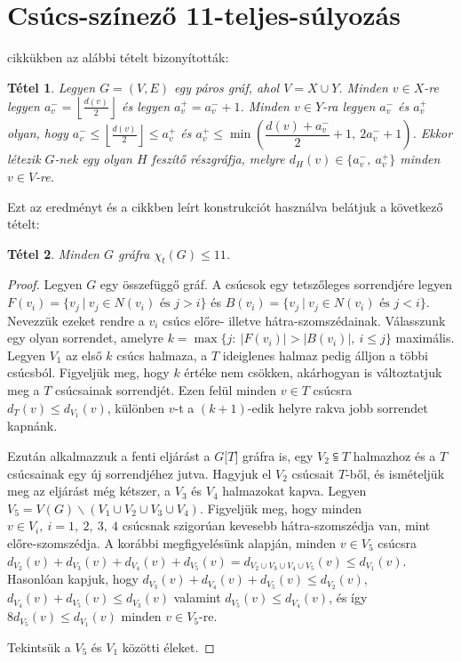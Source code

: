 \documentclass[12pt, a4paper]{report}
\newtheorem{tét}{Tétel}[section]
\theoremstyle{remark}
\theoremstyle{definition}
\begin{document}
\section{Csúcs-színező 11-teljes-súlyozás}
\citeauthor{AddarioBerry2008} \cite{AddarioBerry2008} cikkükben az alábbi tételt bizonyították:

\begin{tét}
Legyen $G=(V, E)$ egy páros gráf, ahol $V = X \cup Y$. Minden $v \in X$-re legyen $a_v^- = \left\lfloor \frac{d(v)}{2} \right\rfloor$ és legyen $a_v^+ = a_v^- + 1$. Minden $v \in Y$-ra legyen $a_v^-$ és $a_v^+$ olyan, hogy $a_v^- \leq \left\lfloor \frac{d(v)}{2} \right\rfloor \leq a_v^+$ és $a_v^+ \leq \min \left( \dfrac{d(v) + a_v^-}{2} + 1,\ 2a_v^- + 1 \right)$. Ekkor létezik $G$-nek egy olyan $H$ feszítő részgráfja, melyre $d_H(v) \in \lbrace a_v^-,\ a_v^+ \rbrace$ minden $v \in V$-re.
\end{tét}

Ezt az eredményt és a cikkben leírt konstrukciót használva belátjuk a következő tételt:

\begin{tét}
Minden $G$ gráfra $\chi_t(G) \leq 11$.
\end{tét}

\begin{proof}
Legyen $G$ egy összefüggő gráf. A csúcsok egy tetszőleges sorrendjére legyen $F(v_i) = \lbrace v_j\ |\ v_j \in N(v_i) \textrm{ és } j > i \rbrace$ és $B(v_i) = \lbrace v_j\ |\ v_j \in N(v_i) \textrm{ és } j < i \rbrace$. Nevezzük ezeket rendre a $v_i$ csúcs előre- illetve hátra-szomszédainak. Válasszunk egy olyan sorrendet, amelyre $k = \max \lbrace j:\ |F(v_i)| > |B(v_i)|,\ i \leq j \rbrace$ maximális. Legyen $V_1$ az első $k$ csúcs halmaza, a $T$ ideiglenes halmaz pedig álljon a többi csúcsból. Figyeljük meg, hogy $k$ értéke nem csökken, akárhogyan is változtatjuk meg a $T$ csúcsainak sorrendjét. Ezen felül minden $v \in T$ csúcsra $d_T(v) \leq d_{V_1}(v)$, különben $v$-t a $(k + 1)$-edik helyre rakva jobb sorrendet kapnánk.

Ezután alkalmazzuk a fenti eljárást a $G \lbrack T \rbrack$ gráfra is, egy $V_2 \subseteqq T$ halmazhoz és a $T$ csúcsainak egy új sorrendjéhez jutva. Hagyjuk el $V_2$ csúcsait $T$-ből, és ismételjük meg az eljárást még kétszer, a $V_3$ és $V_4$ halmazokat kapva. Legyen $V_5 = V(G) \smallsetminus (V_1 \cup V_2 \cup V_3 \cup V_4)$. Figyeljük meg, hogy minden $v \in V_i,\ i = 1,\ 2,\ 3,\ 4$ csúcsnak szigorúan kevesebb hátra-szomszédja van, mint előre-szomszédja. A korábbi megfigyelésünk alapján, minden $v \in V_5$ csúcsra $d_{V_2}(v) + d_{V_3}(v) + d_{V_4}(v) + d_{V_5}(v) = d_{V_2 \cup V_3 \cup V_4 \cup V_5}(v) \leq d_{V_1}(v)$. Hasonlóan kapjuk, hogy $d_{V_3}(v) + d_{V_4}(v) + d_{V_5}(v) \leq d_{V_2}(v)$, $d_{V_4}(v) + d_{V_5}(v) \leq d_{V_3}(v)$ valamint $d_{V_5}(v) \leq d_{V_4}(v)$, és így $8 d_{V_5}(v) \leq d_{V_1}(v)$ minden $v \in V_5$-re.

Tekintsük a $V_5$ és $V_1$ közötti éleket.
\end{proof}
\end{document}
